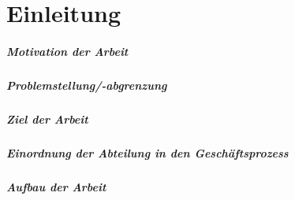 \acresetall 
\chapter{Einleitung}
\paragraph{Motivation der Arbeit}

\paragraph{Problemstellung/-abgrenzung}


\paragraph{Ziel der Arbeit}


\paragraph{Einordnung der Abteilung in den Geschäftsprozess} 
\paragraph{Aufbau der Arbeit}

